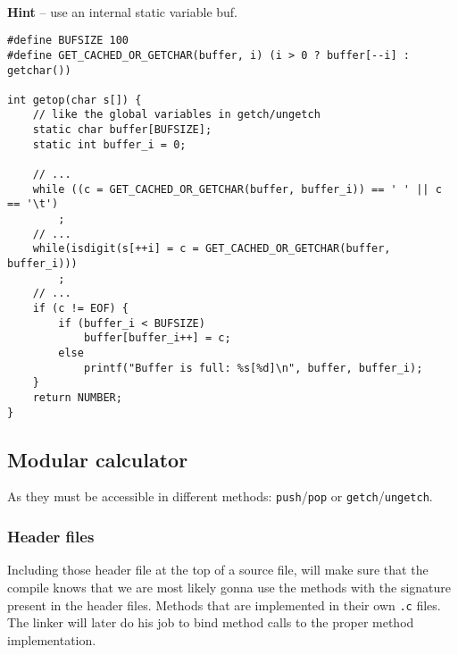 \\{\color{Gray} \textbf{Hint} -- use an internal static variable buf.}

\begin{lstlisting}
#define BUFSIZE 100
#define GET_CACHED_OR_GETCHAR(buffer, i) (i > 0 ? buffer[--i] : getchar())

int getop(char s[]) {
    // like the global variables in getch/ungetch
    static char buffer[BUFSIZE];
    static int buffer_i = 0;

    // ...
    while ((c = GET_CACHED_OR_GETCHAR(buffer, buffer_i)) == ' ' || c == '\t')
        ;
    // ...
    while(isdigit(s[++i] = c = GET_CACHED_OR_GETCHAR(buffer, buffer_i)))
        ;
    // ...
    if (c != EOF) {
        if (buffer_i < BUFSIZE)
            buffer[buffer_i++] = c;
        else
            printf("Buffer is full: %s[%d]\n", buffer, buffer_i);
    }
    return NUMBER;
}
\end{lstlisting}


\subsection{Modular calculator}



As they must be accessible in different methods: \verb!push!/\verb!pop! or \verb!getch!/\verb!ungetch!.


\subsubsection{Header files}


Including those header file at the top of a source file, will make sure that the compile knows that we are most likely gonna use the methods with the signature present in the header files. Methods that are implemented in their own \verb!.c! files.
The linker will later do his job to bind method calls to the proper method implementation.

